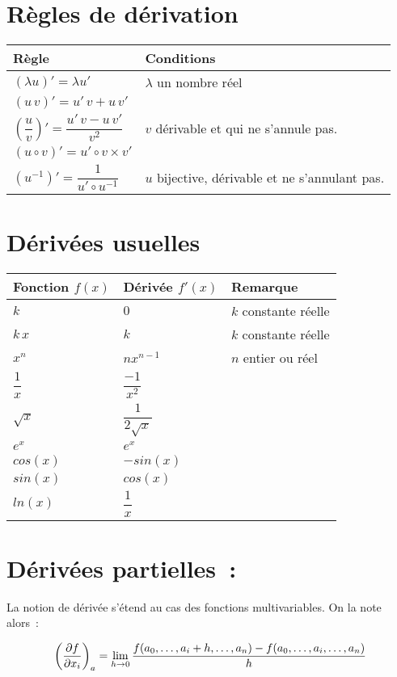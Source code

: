 \pagebreak

\section*{Règles de dérivation}

\begin{center}
	\setlength{\tabulinesep}{2mm}
	\begin{tabu} to 160mm {|X[c]|X[c]|}
	\hline
	\textbf{Règle} & \textbf{Conditions} \\ 
	\hline
	$(\lambda u)' = \lambda u'$ & $\lambda$ un nombre réel \\
	$(u\,v)' = u'\,v+u\,v'$ &  \\
	$\left(\dfrac{u}{v}\right)' = \dfrac{u'\,v-u\,v'}{v^2}$ &  $v$ dérivable et qui ne s'annule pas.\\
	$( u \circ v )' = u' \circ v \times v'$ & \\
	$( u^{-1})' = \dfrac{1}{u' \circ u^{-1}}$ & $u$ bijective, dérivable et ne s'annulant pas.\\
	\hline
\end{tabu}
\end{center}

\section*{Dérivées usuelles}

\begin{center}
	\setlength{\tabulinesep}{2mm}
	\begin{tabu} to 160mm {|X[c]|X[c]|X[c]|}
	\hline
	\textbf{Fonction $f(x)$} & \textbf{Dérivée $f'(x)$} & \textbf{Remarque} \\ 
	\hline
	$k$ & $0$ & $k$ constante réelle\\
	$k\,x$ & $k$ & $k$ constante réelle\\
	$x^n$ & $nx^{n-1}$& $n$ entier ou réel\\
	$\dfrac{1}{x}$ &$\dfrac{-1}{x^2}$ & \\
	$\sqrt{x}$ &$\dfrac{1}{2\sqrt{x}}$ & \\
	$e^x$ & $e^x$ & \\
	$cos(x)$ & $-sin(x)$ & \\
	$sin(x)$ & $cos(x)$ & \\
	$ln(x)$ & $\dfrac{1}{x}$ & \\
	\hline
\end{tabu}
\end{center}


\section*{Dérivées partielles~:}

La notion de dérivée s'étend au cas des fonctions multivariables. On la note alors~:

$$\pdv{f}{x_i}_{a} = \lim\limits_{h \rightarrow 0}{\dfrac{f(a_0,\dots,a_{i}+h,\dots,a_n)-f(a_0,\dots,a_i,\dots,a_n)}{h}}$$

